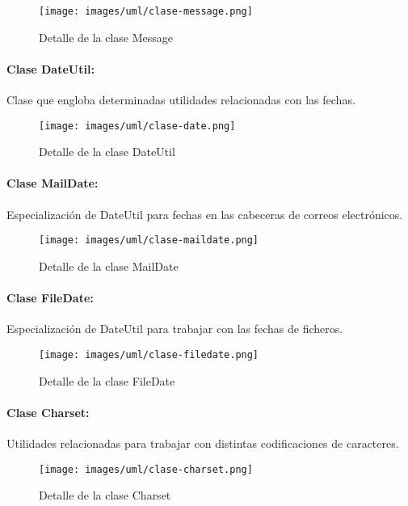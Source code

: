 \begin{figure}[H]
	\centering
 	\texttt{[image: images/uml/clase-message.png]}
	\caption{Detalle de la clase Message}
	\label{fig:uml:message-class}
\end{figure}

\paragraph{Clase DateUtil:}

Clase que engloba determinadas utilidades relacionadas con las fechas.

\begin{figure}[H]
	\centering
 	\texttt{[image: images/uml/clase-date.png]}
	\caption{Detalle de la clase DateUtil}
	\label{fig:uml:dateutil-class}
\end{figure}

\paragraph{Clase MailDate:}

Especialización de DateUtil para fechas en las cabeceras de correos electrónicos.

\begin{figure}[H]
	\centering
 	\texttt{[image: images/uml/clase-maildate.png]}
	\caption{Detalle de la clase MailDate}
	\label{fig:uml:maildate-class}
\end{figure}

\paragraph{Clase FileDate:}

Especialización de DateUtil para trabajar con las fechas de ficheros.

\begin{figure}[H]
	\centering
 	\texttt{[image: images/uml/clase-filedate.png]}
	\caption{Detalle de la clase FileDate}
	\label{fig:uml:filedate-class}
\end{figure}

\paragraph{Clase Charset:}

Utilidades relacionadas para trabajar con distintas codificaciones de caracteres.

\begin{figure}[H]
	\centering
 	\texttt{[image: images/uml/clase-charset.png]}
	\caption{Detalle de la clase Charset}
	\label{fig:uml:charset-class}
\end{figure}

